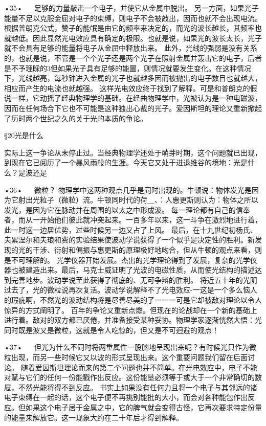 •35•
  
足够的力量敲击一个电子，并使它从金属中脱出。
另一方面，如果光子能量不足以克服金屈对电子的束缚，则电子不会被敲出，因而也就不会出现电流。根据普朗克公式，赞子的能氓是由它的频率来决定的，而光的波长越长，其频率也就越低。因此显然光电效应具有确定的极限。也就是说，如果光的波长太长，光子就不会具有足够的能量将电子从金屈中释放出来。
此外，光线的强弱是没有关系的，也就是说，不管是一个个光子还是两个光子在照射金属并轰击它的电子，后者是不予理睬的3但如果光子具有足够的能噩，则情况就要发生变化。在这种情况下，光线越亮，每秒钟进入金属的光子也就越多因而被抛出的电子数目也就越大，相应而产生的电流也就越强。
这样光电效应终于找到了解释。可是和普朗克的假说一样，它动摇了经典物理学的基础。在经曲物理学中，光被认为是一种电磁波，因而在任何场合下它也不可能是这种独出心裁的光子。爱因斯坦的理论又重新掀起了历时两个世纪之久的关于光的本质的争论。

§20光是什么

实际上这一争论从末停止过。当经典物理学还处于萌芽时期，这个问题就已出现，到现在它已阅历了一个暴风雨般的生涯。今天它又处于进退维谷的境地：光是什么？是波还是

•36•
  
微粒？
物理学中这两种观点几乎是同时出现的。牛顿说：物体发光是因为它射出光粒子（微粒）流。牛顿同时代的荷＿、：人惠更斯则认为：物体之所以发光，是因为它在脉动并在周围的以太之中形成波。
每一理论都有自己的信奉者，而从一开始他们彼此就冲突起来。一百多年以来，这一斗争在激烈地进行着，此一时这一边居优势，过些时候另一边又占了上风。
最后，在十九世纪初杨氏、夫累涅尔和夫琅和费的实验结果使波动学说获得了一个似乎是决定性的胜利。新发现的光的干涉、衍射和偏振与惠更斯的原理极好地吻合，但从牛顿的观点来看，则是不可理解的。
光学仪器开始发展。杰出的光学理论得到了发展，复杂的光学仪器也被建造出来。最后，马克士威证明了光波的电磁性质，从而使光结构的描述达到完善地步。波动学说至此获得了彻底的、无可争辩的胜利。
将近五十年的光阴过去了，光的微粒说再次复活。波动学说解释不了光电效应-一这是一个多么恼人的瑕疵啊，不然光的波动结构将是尽善尽美的了一一一可是它却被敌对理论以令人惊异的方式阐明了。
百年的争论又重新点燃。但现在的论战却在一个新的基础上进行着。敌对的双方都已厌倦，并准备接受某种妥协。物理学家逐渐恍然大悟：光同时既是波又是微粒，这就是令人吃惊的，但又是不可迥避的观点！

•37•
  
但光为什么不同时将两重属性一股脑地呈现出来呢？有时候光只作为微粒出现，而另一些时候它又以波的形式呈现出来。这个重要问题我们留在后面讨论。
随着爱因斯坦理论而来的第二个问题也并不简单。在光电效应中，电子不能对赋与它们的任何一份能戳作出反应。这份能垦必须等于或大于一个非常确切的数屉，不然光能将得不到反应。
书实上如果没有任何力且将一个电子与其邻远的诸电子束缚在一起的话，这个电子便不再挑别能批的大小，而会对各种能包作出反应。但如果这个电子居于金属之中，它的脾气就会变得古怪，它再次要求特定份量的能量来解放它。这一现象大约在二十年后才得到解释。

